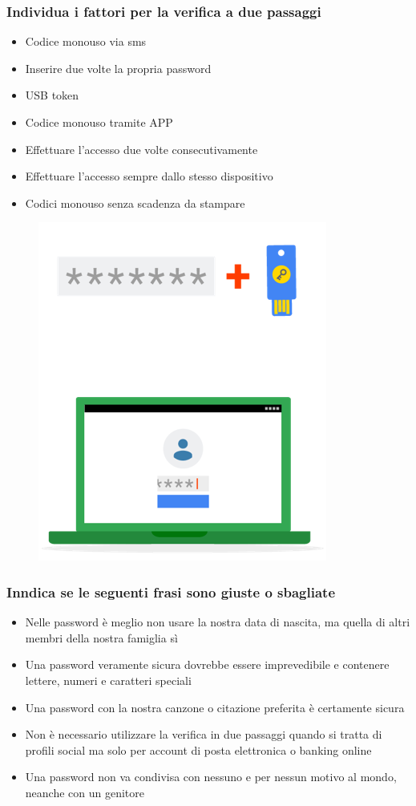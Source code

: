 \documentclass{article}
\begin{document}
\subsubsection{Individua i fattori per la verifica a due passaggi}
\label{sec:Caso13}
\begin{itemize}
	\item Codice monouso via sms
	\item Inserire due volte la propria password
	\item USB token
	\item Codice monouso tramite APP
	\item Effettuare l'accesso due volte consecutivamente
	\item Effettuare l'accesso sempre dallo stesso dispositivo
	\item Codici monouso senza scadenza da stampare
\end{itemize}
\begin{figure}[h!]
	\centering
	\includegraphics[scale=0.5]{Passaggi2.png}
\end{figure}
\subsubsection{Inndica se le seguenti frasi sono giuste o sbagliate}
\label{sec:Caso14}
\begin{itemize}
	\item Nelle password è meglio non usare la nostra data di nascita, ma quella di altri membri della nostra famiglia sì		
	\item Una password veramente sicura dovrebbe essere imprevedibile e contenere lettere, numeri e caratteri speciali		
	\item Una password con la nostra canzone o citazione preferita è certamente sicura
	\item Non è necessario utilizzare la verifica in due passaggi quando si tratta di profili social ma solo per account di posta elettronica o banking online		
	\item Una password non va condivisa con nessuno e per nessun motivo al mondo, neanche con un genitore
\end{itemize}
\end{document}
